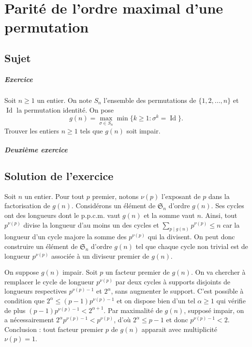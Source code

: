 \chapter{Parité de l'ordre maximal d'une permutation}

\section{Sujet}

\paragraph{Exercice}
Soit $n\geqslant 1$ un entier. On note $S_n$ l'ensemble des permutations de $\{1,2,\ldots,n\}$ et $\operatorname{Id}$ la permutation identité. On pose
\[
g(n) = \max_{\sigma \in S_n} \min\{k \geqslant 1 : \sigma^k = \operatorname{Id}\}.
\]
Trouver les entiers $n \geqslant 1$ tels que $g(n)$ soit impair.

\paragraph{Deuxième exercice}

\section{Solution de l'exercice}

Soit $n$ un entier. Pour tout $p$ premier, notons $\nu(p)$ l'exposant de $p$ dans la factorisation de $g(n)$. Considérons un élément de $\mathfrak S_n$ d'ordre $g(n)$. Ses cycles ont des longueurs dont le p.p.c.m. vaut $g(n)$ et la somme vaut $n$. Ainsi, tout $p^{\nu(p)}$ divise la longueur d'au moins un des cycles et $\sum_{p\mid g(n)} p^{\nu(p)} \leq n$ car la longueur d'un cycle majore la somme des $p^{\nu(p)}$ qui la divisent. On peut donc construire un élément de $\mathfrak S_n$ d'ordre $g(n)$ tel que chaque cycle non trivial est de longueur $p^{\nu(p)}$ associée à un diviseur premier de $g(n)$.

On suppose $g(n)$ impair. Soit $p$ un facteur premier de $g(n)$. On va chercher à remplacer le cycle de longueur $p^{\nu(p)}$ par deux cycles à supports disjoints de longueurs respectives $p^{\nu(p)-1}$ et $2^\alpha$, sans augmenter le support. C'est possible à condition que $2^\alpha \leq (p-1) p^{\nu(p)-1}$ et on dispose bien d'un tel $\alpha \geq 1$ qui vérifie de plus $(p-1)p^{\nu(p)-1} < 2^{\alpha+1}$. Par maximalité de $g(n)$, supposé impair, on a nécessairement $2^\alpha p^{\nu(p)-1} < p^{\nu(p)}$, d'où $2^\alpha \leq p - 1$ et donc $p^{\nu(p)-1} < 2$. Conclusion : tout facteur premier $p$ de $g(n)$ apparait avec multiplicité $\nu(p)=1$.

